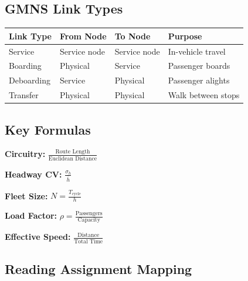 \documentclass[11pt,letterpaper]{article}
\begin{document}
\subsection{GMNS Link Types}

\begin{center}
\begin{tabular}{llll}
\toprule
\textbf{Link Type} & \textbf{From Node} & \textbf{To Node} & \textbf{Purpose} \\
\midrule
Service & Service node & Service node & In-vehicle travel \\
Boarding & Physical & Service & Passenger boards \\
Deboarding & Service & Physical & Passenger alights \\
Transfer & Physical & Physical & Walk between stops \\
\bottomrule
\end{tabular}
\end{center}

\subsection{Key Formulas}

\begin{tcolorbox}[colback=lightgray, colframe=darkblue]
\textbf{Circuitry:} $\displaystyle \frac{\text{Route Length}}{\text{Euclidean Distance}}$

\vspace{0.3cm}
\textbf{Headway CV:} $\displaystyle \frac{\sigma_h}{\bar{h}}$

\vspace{0.3cm}
\textbf{Fleet Size:} $\displaystyle N = \frac{T_{\text{cycle}}}{h}$

\vspace{0.3cm}
\textbf{Load Factor:} $\displaystyle \rho = \frac{\text{Passengers}}{\text{Capacity}}$

\vspace{0.3cm}
\textbf{Effective Speed:} $\displaystyle \frac{\text{Distance}}{\text{Total Time}}$
\end{tcolorbox}

\subsection{Reading Assignment Mapping}
\end{document}
